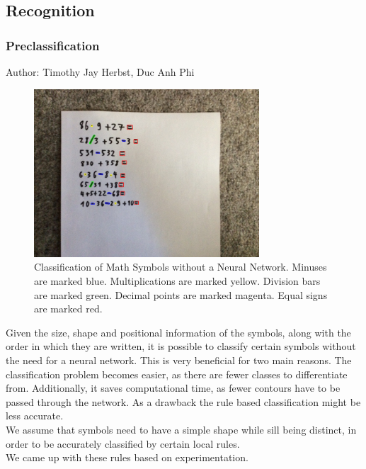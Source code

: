 \documentclass[12pt]{article}
\begin{document}
	\pagebreak\subsection{Recognition}
	\subsubsection{Preclassification}
	
	\small{Author: Timothy Jay Herbst, Duc Anh Phi} \newline \newline
	\begin{figure}[h!]
		\centering
		\includegraphics[width=0.75\textwidth]{ImagesForReport/preclassify.jpg}
		\caption{Classification of Math Symbols without a Neural Network.
		Minuses are marked blue. Multiplications are marked yellow.  Division bars are marked green. Decimal points are marked magenta. Equal signs are marked red.}
		\label{fig:preclassify}
	\end{figure}

	Given the size, shape and positional information of the symbols, along with the order in which they are written, it is possible to classify certain symbols without the need for a neural network. 
	This is very beneficial for two main reasons. 
	The classification problem becomes easier, as there are fewer classes to differentiate from.
	Additionally, it saves computational time, as fewer contours have to be passed through the network. As a drawback the rule based classification might be less accurate.\\
	We assume that symbols need to have a simple shape while sill being distinct, in order to be accurately classified by certain local rules.\\
	We came up with these rules based on experimentation.
	
\end{document}

